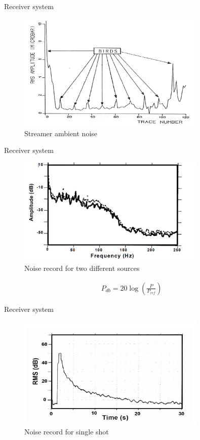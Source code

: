\documentclass[xcolor=dvipsnames,notes]{beamer}
\begin{document}
\begin{frame}{Receiver system}
\begin{figure}
  \includegraphics[width=0.8\textwidth]{Fig/birds.png}
  \caption{Streamer ambient noise}
  \label{fig:birds}
\end{figure}
\end{frame}
\begin{frame}{Receiver system}
\begin{figure}
  \includegraphics[width=0.8\textwidth]{Fig/noise1.png}
  \caption{Noise record for two different sources}
  \label{fig:noise1}
\end{figure}
\begin{eqnarray}
  P_{db}  =  20 \log\left( \frac{P}{P_{ref}}\right)
\end{eqnarray}
\end{frame}
\begin{frame}{Receiver system}
\begin{figure}
  \includegraphics[width=0.8\textwidth]{Fig/noise2.png}
  \caption{Noise record for single shot}
  \label{fig:noise1}
\end{figure}
\end{frame}
\end{document}
